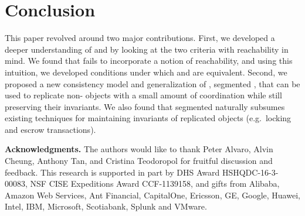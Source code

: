 \section{Conclusion}
This paper revolved around two major contributions.  First, we developed a
deeper understanding of \invariantclosure{} and \invariantconfluence{} by
looking at the two criteria with reachability in mind. We found that
\invariantclosure{} fails to incorporate a notion of reachability, and using
this intuition, we developed conditions under which \invariantclosure{} and
\invariantconfluence{} are equivalent.  Second, we proposed a new consistency
model and generalization of \invariantconfluence{}, segmented
\invariantconfluence{}, that can be used to replicate non-\invariantconfluent{}
objects with a small amount of coordination while still preserving their
invariants. We also found that segmented \invariantconfluence{} naturally
subsumes existing techniques for maintaining invariants of replicated objects
(e.g.\ locking and escrow transactions).

\textbf{Acknowledgments.}
The authors would like to thank Peter Alvaro, Alvin Cheung, Anthony Tan, and
Cristina Teodoropol for fruitful discussion and feedback.
%
This research is supported in part by DHS Award HSHQDC-16-3-00083, NSF CISE
Expeditions Award CCF-1139158, and gifts from Alibaba, Amazon Web Services, Ant
Financial, CapitalOne, Ericsson, GE, Google, Huawei, Intel, IBM, Microsoft,
Scotiabank, Splunk and VMware.
